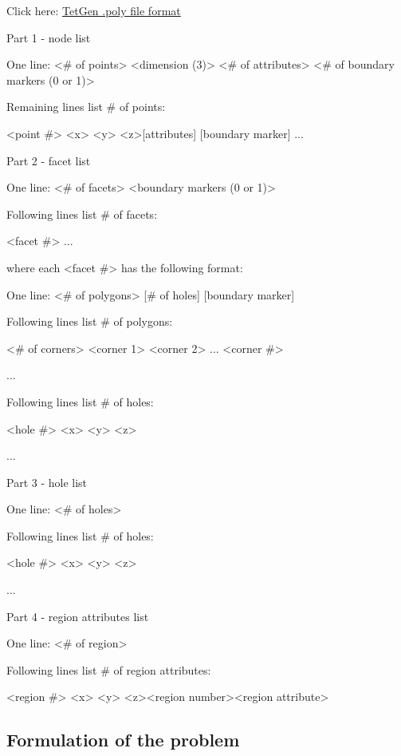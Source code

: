 Click here: \href{http://wias-berlin.de/software/tetgen/fformats.poly.html}{TetGen .poly file format}

Part 1 - node list

    One line: <\# of points> <dimension (3)> <\# of attributes> <\# of boundary markers (0 or 1)>
    
    Remaining lines list \# of points:
    
    <point \#> <x> <y> <z>[attributes] [boundary marker]
    ... 

Part 2 - facet list

    One line: <\# of facets> <boundary markers (0 or 1)>
    
    Following lines list \# of facets:
    
    <facet \#>
    ... 

where each <facet \#> has the following format:

    One line: <\# of polygons> [\# of holes] [boundary marker]
    
    Following lines list \# of polygons:
    
    <\# of corners> <corner 1> <corner 2> ... <corner \#>
    
    ...
    
    Following lines list \# of holes:
    
    <hole \#> <x> <y> <z>
    
    ... 

Part 3 - hole list

    One line: <\# of holes>
    
    Following lines list \# of holes:
    
    <hole \#> <x> <y> <z>
    
    ... 

Part 4 - region attributes list

    One line: <\# of region>
    
    Following lines list \# of region attributes:
    
    <region \#> <x> <y> <z><region number><region attribute>

\subsection{Formulation of the problem}

